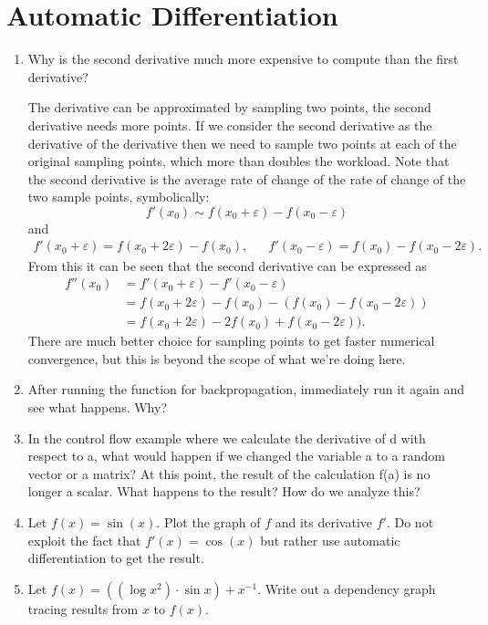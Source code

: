 \documentclass{article}
\begin{document}
\section{Automatic Differentiation}
\begin{enumerate}
\item Why is the second derivative much more expensive to compute than the first derivative?
	\begin{itemize}
		The derivative can be approximated by sampling two points, the second derivative needs more points. If we consider the second derivative as the derivative of the derivative then we need to sample two points at each of the original sampling points, which more than doubles the workload. Note that the second derivative is the average rate of change of the rate of change of the two sample points, symbolically:
		$$
		f'(x_0) \sim f(x_0 + \varepsilon) - f(x_0 - \varepsilon)
		$$
		and
		\begin{align*}
		f'(x_0 + \varepsilon) = f(x_0 + 2\varepsilon) - f(x_0),&&f'(x_0 - \varepsilon) = f(x_0) - f(x_0 - 2\varepsilon).
		\end{align*}
		From this it can be seen that the second derivative can be expressed as
		\begin{align*}
		f''(x_0) &= f'(x_0 + \varepsilon) - f'(x_0 - \varepsilon) \\
		&= f(x_0 + 2\varepsilon) - f(x_0) - (f(x_0) - f(x_0 - 2\varepsilon)) \\
		&= f(x_0 + 2\varepsilon) - 2f(x_0) + f(x_0 - 2\varepsilon)).
		\end{align*}
		There are much better choice for sampling points to get faster numerical convergence, but this is beyond the scope of what we're doing here. 
	\end{itemize}
\item After running the function for backpropagation, immediately run it again and see what happens. Why?
\item In the control flow example where we calculate the derivative of d with respect to a, what would happen if we changed the variable a to a random vector or a matrix? At this point, the result of the calculation f(a) is no longer a scalar. What happens to the result? How do we analyze this?
\item Let $f(x) = \sin(x)$. Plot the graph of $f$ and its derivative $f'$. Do not exploit the fact that $f'(x) = \cos(x)$ but rather use automatic differentiation to get the result.
\item Let $f(x) = ((\log x^2) \cdot \sin x) + x^{-1}$. Write out a dependency graph tracing results from $x$ to $f(x)$.

\end{enumerate}
\end{document}
